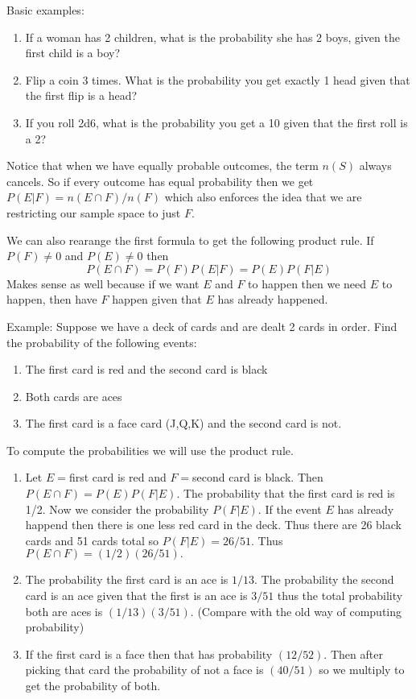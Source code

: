 \documentclass[14,fleqn]{article}
\begin{document}
Basic examples:\\
\begin{enumerate}[topsep=0pt]
	\item If a woman has 2 children, what is the probability she has 2 boys, given the first child is a boy?
	\item Flip a coin 3 times. What is the probability you get exactly 1 head given that the first flip is a head?
	\item If you roll 2d6, what is the probability you get a 10 given that the first roll is a 2?
\end{enumerate}

Notice that when we have equally probable outcomes, the term $n(S)$ always cancels. So if every outcome has equal probability then we get $P(E|F)=n(E\cap F)/n(F)$ which also enforces the idea that we are restricting our sample space to just $F.$

We can also rearange the first formula to get the following product rule. If $P(F)\neq 0$ and $P(E)\neq 0$ then
\[
	P(E\cap F)=P(F)P(E|F)=P(E)P(F|E)
\]
Makes sense as well because if we want $E$ and $F$ to happen then we need $E$ to happen, then have $F$ happen given that $E$ has already happened.

Example:
Suppose we have a deck of cards and are dealt 2 cards in order. Find the probability of the following events:
\begin{enumerate}[topsep=0 pt]
	\item The first card is red and the second card is black
	\item Both cards are aces
	\item The first card is a face card (J,Q,K) and the second card is not.
\end{enumerate}

To compute the probabilities we will use the product rule.
\begin{enumerate}
	\item Let $E=$first card is red and $F=$second card is black. Then $P(E\cap F)=P(E)P(F|E).$ The probability that the first card is red is 1/2. Now we consider the probability $P(F|E).$ If the event $E$ has already happend then there is one less red card in the deck. Thus there are 26 black cards and 51 cards total so $P(F|E)=26/51.$ Thus $P(E\cap F)=(1/2)(26/51).$
	\item The probability the first card is an ace is $1/13.$ The probability the second card is an ace given that the first is an ace is $3/51$ thus the total probability both are aces is $(1/13)(3/51).$ (Compare with the old way of computing probability)
\item If the first card is a face then that has probability $(12/52).$ Then after picking that card the probability of not a face is $(40/51)$ so we multiply to get the probability of both.
\end{enumerate}
\end{document}
